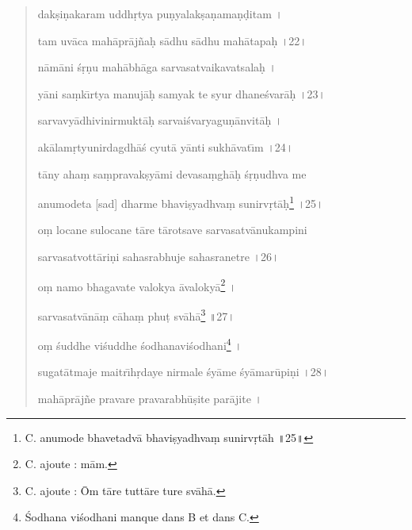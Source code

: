 \documentclass[a4paper, 11pt, oneside, french]{article}
\begin{document}
\begin{quotation}
\bigskip

dak\d{s}i\d{n}akaram uddh\d{r}tya pu\d{n}yalak\d{s}a\d{n}ama\d{n}\d{d}itam \texthindi{।}

tam uv\={a}ca mah\={a}pr\={a}j\~{n}a\d{h} s\={a}dhu s\={a}dhu mah\={a}tapa\d{h} \texthindi{।}22\texthindi{।}

\bigskip

n\={a}m\={a}ni \'{s}\d{r}\d{n}u mah\={a}bh\={a}ga sarvasatvaikavatsala\d{h} \texthindi{।}

y\={a}ni sa\d{m}k\={\i}rtya manuj\={a}\d{h} samyak te syur dhane\'{s}var\={a}\d{h} \texthindi{।}23\texthindi{।}

\bigskip

sarvavy\={a}dhivinirmukt\={a}\d{h} sarvai\'{s}varyagu\d{n}\={a}nvit\={a}\d{h} \texthindi{।}

ak\={a}lam\d{r}tyunirdagdh\={a}\'{s} cyut\={a} y\={a}nti sukh\={a}vat\={\i}m \texthindi{।}24\texthindi{।}

\bigskip

t\={a}ny aha\d{m} sa\d{m}pravak\d{s}y\={a}mi devasa\d{m}gh\={a}\d{h} \'{s}\d{r}\d{n}udhva me

anumodeta [sad] dharme bhavi\d{s}yadhva\d{m} sunirv\d{r}t\={a}\d{h}\footnote{C. anumode bhavetadv\={a} bhavi\d{s}yadhva\d{m} sunirv\d{r}t\={a}h \texthindi{॥}25\texthindi{॥}} \texthindi{।}25\texthindi{।}

\bigskip

o\d{m} locane sulocane t\={a}re t\={a}rotsave sarvasatv\={a}nukampini

sarvasatvott\={a}ri\d{n}i sahasrabhuje sahasranetre \texthindi{।}26\texthindi{।}

\bigskip

o\d{m} namo bhagavate valokya \={a}valoky\={a}\footnote{C. ajoute : m\={a}m.} \texthindi{।}

sarvasatv\={a}n\={a}\d{m} c\={a}ha\d{m} phu\d{t} sv\={a}h\={a}\footnote{C. ajoute : \={O}m t\={a}re tutt\={a}re ture sv\={a}h\={a}.} \texthindi{॥}27\texthindi{।}

\bigskip

o\d{m} \'{s}uddhe vi\'{s}uddhe \'{s}odhanavi\'{s}odhani\footnote{\'{S}odhana vi\'{s}odhani manque dans B et dans C.} \texthindi{।}

sugat\={a}tmaje maitr\={\i}h\d{r}daye nirmale \'{s}y\={a}me \'{s}y\={a}mar\={u}pi\d{n}i \texthindi{।}28\texthindi{।}

\bigskip

mah\={a}pr\={a}j\~{n}e pravare pravarabh\={u}\d{s}ite par\={a}jite \texthindi{।}


\end{quotation}
\end{document}
